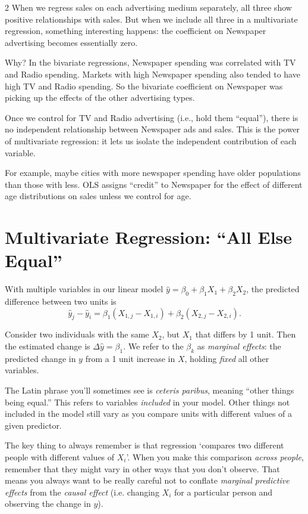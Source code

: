 \documentclass[12pt]{article}
\begin{document}
\begin{multicols}{2}
  When we regress sales on each advertising medium separately, all three show positive relationships with sales. But when we include all three in a multivariate regression, something interesting happens: the coefficient on Newspaper advertising becomes essentially zero.

  Why? In the bivariate regressions, Newspaper spending was correlated with TV and Radio spending. Markets with high Newspaper spending also tended to have high TV and Radio spending. So the bivariate coefficient on Newspaper was picking up the effects of the other advertising types.

  Once we control for TV and Radio advertising (i.e., hold them ``equal''), there is no independent relationship between Newspaper ads and sales. This is the power of multivariate regression: it lets us isolate the independent contribution of each variable.

  For example, maybe cities with more newspaper spending have older populations than those with less. 
  OLS assigns ``credit'' to Newspaper for the effect of different age distributions on sales unless we control for age.

  \section*{Multivariate Regression: ``All Else Equal''}

  With multiple variables in our linear model $\hat{y} = \beta_0 + \beta_1 X_1 + \beta_2 X_2$, the predicted difference between two units is
  $$\hat{y}_j - \hat{y}_i = \beta_1 (X_{1,j} - X_{1,i}) + \beta_2 (X_{2,j} - X_{2,i}).$$

  Consider two individuals with the same $X_2$, but $X_1$ that differs by 1 unit. Then the estimated change is $\Delta \hat{y} = \beta_1$. We refer to the $\beta_k$ as \emph{marginal effects}: the predicted change in $y$ from a 1 unit increase in $X$, holding \emph{fixed} all other variables.

  The Latin phrase you'll sometimes see is \emph{ceteris paribus}, meaning ``other things being equal.'' 
  This refers to variables \emph{included} in your model. 
  Other things not included in the model still vary as you compare units with different values of a given predictor.

  The key thing to always remember is that regression `compares two different people with different values of $X_i$'.
  When you make this comparison \emph{across people}, remember that they might vary in other ways that you don't observe. 
  That means you always want to be really careful not to conflate \emph{marginal predictive effects} from the \emph{causal effect} (i.e. changing $X_i$ for a particular person and observing the change in $y$). 



\end{multicols}
\end{document}
